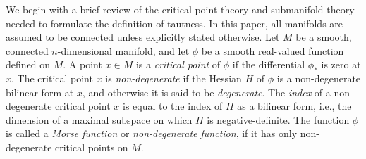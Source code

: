 \documentclass[12pt]{article}
\begin{document}
We begin with a brief review of the critical point theory
and submanifold theory needed
to formulate the definition of tautness.
In this paper, all manifolds are assumed to be  connected unless
explicitly stated otherwise.  Let $M$ be a smooth,
connected $n$-dimensional manifold, and let $\phi$ be a smooth
real-valued function defined on $M$.  A point $x \in M$ is a
{\em critical point} of $\phi$ if the differential $\phi_*$ is
zero at $x$.  The critical point $x$ is {\em non-degenerate}
if the Hessian $H$ of $\phi$ is a non-degenerate bilinear form
at $x$, and otherwise it is said to be {\em degenerate}.  The
{\em index} of a non-degenerate critical point $x$ is equal to
the index of $H$ as a bilinear form, i.e., the dimension of 
a maximal subspace on which $H$ is negative-definite.  The
function $\phi$ is called a {\em Morse function} or
{\em non-degenerate function}, if it has only non-degenerate 
critical points on $M$.
\end{document}
